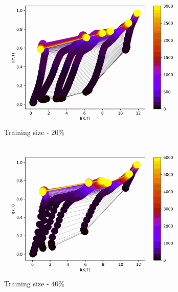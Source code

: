 \documentclass[dissertation.tex]{subfiles}
\begin{document}
\begin{figure}[ht]
  \centering
  \begin{subfigure}[t]{0.32\textwidth}
    \centering
    \includegraphics[width=\textwidth]{figs/eval/trainingSizeRelu/KDE20.jpg}
    \caption{
      Training size - 20\%
    }
  \end{subfigure}
  \begin{subfigure}[t]{0.32\textwidth}
    \centering
    \includegraphics[width=\textwidth]{figs/eval/trainingSizeRelu/KDE40.jpg}
    \caption{
      Training size - 40\%
    }
  \end{subfigure}
  \begin{subfigure}[t]{0.32\textwidth}
    \centering

\end{subfigure}
\end{figure}
\end{document}
